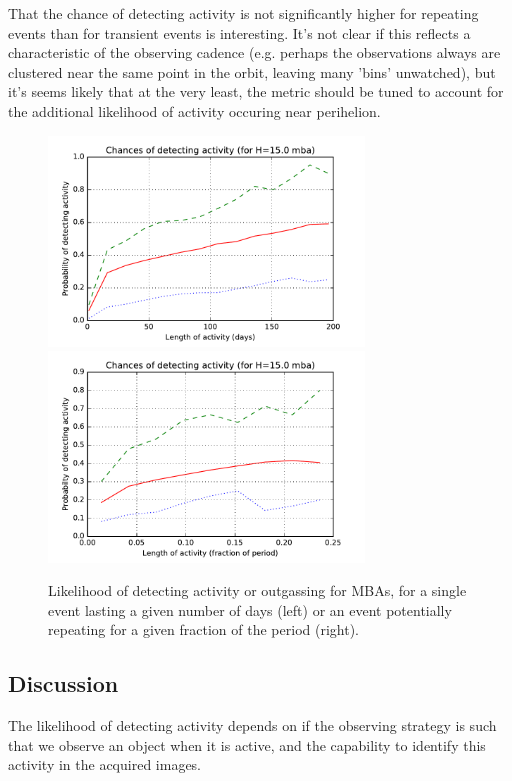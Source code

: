 That the chance of detecting activity is not significantly higher for
repeating events than for transient events is interesting. It's not
clear if this reflects a characteristic of the observing cadence
(e.g. perhaps the observations always are clustered near the same
point in the orbit, leaving many 'bins' unwatched), but it's seems
likely that at  the very least, the metric should be tuned to account for the additional
likelihood of activity occuring near perihelion.

\begin{figure}
\includegraphics[width=3.3in]{figs/solarsystem/minion_1016_mba_Activity_time}
\includegraphics[width=3.3in]{figs/solarsystem/minion_1016_mba_Activity_period}
\caption{Likelihood of detecting activity or outgassing for MBAs, for
  a single event lasting a given number of days (left) or an event
  potentially repeating for a given fraction of the period (right). 
\label{activity}}
\end{figure}



\subsection{Discussion}
\label{sec:\secname:discussion}

The likelihood of detecting activity depends on if the observing
strategy is such that we observe an object when it is active, and the
capability to identify this activity in the acquired images.

